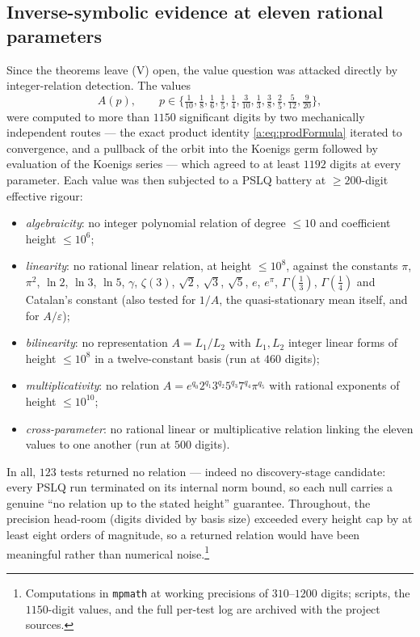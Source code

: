 \subsection{Inverse-symbolic evidence at eleven rational parameters}
\label{a:subsec:pslq}

Since the theorems leave (V) open, the value question was attacked directly by integer-relation detection. The values
\[
A(p),\qquad p\in\bigl\{\tfrac1{10},\tfrac18,\tfrac16,\tfrac15,\tfrac14,\tfrac3{10},\tfrac13,\tfrac38,\tfrac25,\tfrac5{12},\tfrac9{20}\bigr\},
\]
were computed to more than $1150$ significant digits by two mechanically independent routes --- the exact product identity \eqref{a:eq:prodFormula} iterated to convergence, and a pullback of the orbit into the Koenigs germ followed by evaluation of the Koenigs series --- which agreed to at least $1192$ digits at every parameter. Each value was then subjected to a PSLQ battery at $\ge200$-digit effective rigour:
\begin{itemize}
\item \emph{algebraicity}: no integer polynomial relation of degree $\le10$ and coefficient height $\le10^{6}$;
\item \emph{linearity}: no rational linear relation, at height $\le10^{8}$, against the constants $\pi$, $\pi^{2}$, $\ln2$, $\ln3$, $\ln5$, $\gamma$, $\zeta(3)$, $\sqrt2$, $\sqrt3$, $\sqrt5$, $e$, $e^{\pi}$, $\Gamma(\tfrac13)$, $\Gamma(\tfrac14)$ and Catalan's constant (also tested for $1/A$, the quasi-stationary mean itself, and for $A/\varepsilon$);
\item \emph{bilinearity}: no representation $A=L_1/L_2$ with $L_1,L_2$ integer linear forms of height $\le10^{8}$ in a twelve-constant basis (run at $460$ digits);
\item \emph{multiplicativity}: no relation $A=e^{q_0}2^{q_1}3^{q_2}5^{q_3}7^{q_4}\pi^{q_5}$ with rational exponents of height $\le10^{10}$;
\item \emph{cross-parameter}: no rational linear or multiplicative relation linking the eleven values to one another (run at $500$ digits).
\end{itemize}
In all, $123$ tests returned no relation --- indeed no discovery-stage candidate: every PSLQ run terminated on its internal norm bound, so each null carries a genuine ``no relation up to the stated height'' guarantee. Throughout, the precision head-room (digits divided by basis size) exceeded every height cap by at least eight orders of magnitude, so a returned relation would have been meaningful rather than numerical noise.\footnote{Computations in \texttt{mpmath} at working precisions of $310$--$1200$ digits; scripts, the $1150$-digit values, and the full per-test log are archived with the project sources.}

